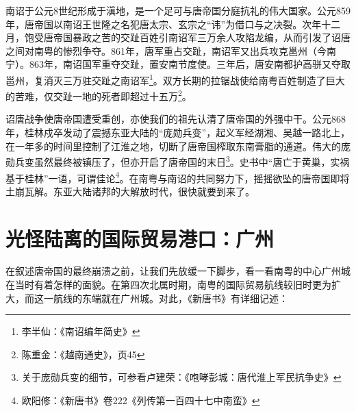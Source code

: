 南诏于公元8世纪形成于滇地，是一个足可与唐帝国分庭抗礼的伟大国家。公元859年，唐帝国以南诏王世隆之名犯唐太宗、玄宗之“讳”为借口与之决裂。次年十二月，饱受唐帝国暴政之苦的交趾百姓引南诏军三万余人攻陷龙编，从而引发了诏唐之间对南粤的惨烈争夺。861年，唐军重占交趾，南诏军又出兵攻克邕州（今南宁）。863年，南诏国军重夺交趾，置安南节度使。三年后，唐安南都护高骈又夺取邕州，复消灭三万驻交趾之南诏军\footnote{李半仙：《南诏编年简史》}。双方长期的拉锯战使给南粤百姓制造了巨大的苦难，仅交趾一地的死者即超过十五万\footnote{陈重金：《越南通史》，页45}。

诏唐战争使唐帝国遭受重创，亦使我们的祖先认清了唐帝国的外强中干。公元868年，桂林戍卒发动了震撼东亚大陆的“庞勋兵变”，起义军经湖湘、吴越一路北上，在一年多的时间里控制了江淮之地，切断了唐帝国榨取东南膏脂的通道。伟大的庞勋兵变虽然最终被镇压了，但亦开启了唐帝国的末日\footnote{关于庞勋兵变的细节，可参看卢建荣：《咆哮彭城：唐代淮上军民抗争史》}。史书中“唐亡于黄巢，实祸基于桂林”一语，可谓佳论\footnote{欧阳修：《新唐书》卷222《列传第一百四十七中南蛮》}。在南粤与南诏的共同努力下，摇摇欲坠的唐帝国即将土崩瓦解。东亚大陆诸邦的大解放时代，很快就要到来了。

\section{光怪陆离的国际贸易港口：广州}

\indent 在叙述唐帝国的最终崩溃之前，让我们先放缓一下脚步，看一看南粤的中心广州城在当时有着怎样的面貌。在第四次北属时期，南粤的国际贸易航线较旧时更为扩大，而这一航线的东端就在广州城。对此，《新唐书》有详细记述：

